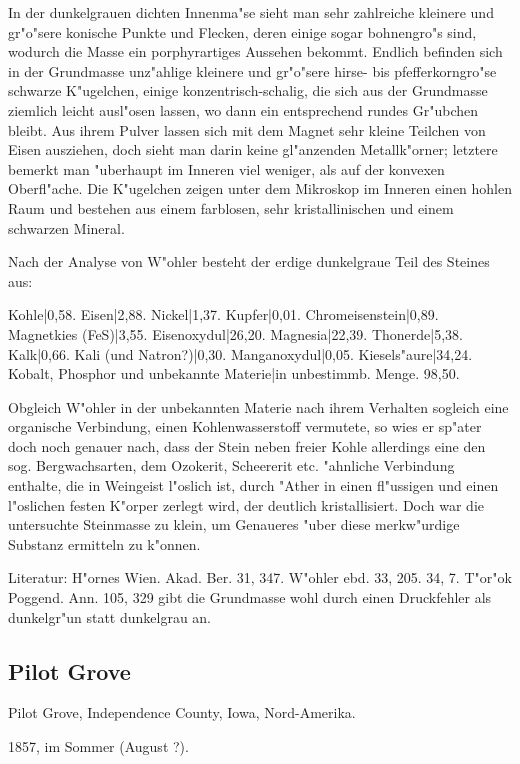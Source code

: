 \documentclass[a4paper, 11pt, oneside]{article}
\begin{document}
In der dunkelgrauen dichten Innenma"se sieht man sehr zahlreiche kleinere und gr"o"sere konische Punkte und Flecken, deren einige sogar bohnengro"s sind, wodurch die Masse ein porphyrartiges Aussehen bekommt. Endlich befinden sich in der Grundmasse unz"ahlige kleinere und gr"o"sere hirse- bis pfefferkorngro"se schwarze K"ugelchen, einige konzentrisch-schalig, die sich aus der Grundmasse ziemlich leicht ausl"osen lassen, wo dann ein entsprechend rundes Gr"ubchen bleibt. Aus ihrem Pulver lassen sich mit dem Magnet sehr kleine Teilchen von Eisen ausziehen, doch sieht man darin keine gl"anzenden Metallk"orner; letztere bemerkt man "uberhaupt im Inneren viel weniger, als auf der konvexen Oberfl"ache. Die K"ugelchen zeigen unter dem Mikroskop im Inneren einen hohlen Raum und bestehen aus einem farblosen, sehr kristallinischen und einem schwarzen Mineral.

Nach der Analyse von W"ohler besteht der erdige dunkelgraue Teil des Steines aus:

Kohle|0,58.  
Eisen|2,88.  
Nickel|1,37.  
Kupfer|0,01.  
Chromeisenstein|0,89.  
Magnetkies (FeS)|3,55.  
Eisenoxydul|26,20.  
Magnesia|22,39.  
Thonerde|5,38.  
Kalk|0,66.  
Kali (und Natron?)|0,30.  
Manganoxydul|0,05.  
Kiesels"aure|34,24.  
Kobalt, Phosphor und unbekannte Materie|in unbestimmb. Menge.  
98,50.

Obgleich W"ohler in der unbekannten Materie nach ihrem Verhalten sogleich eine organische Verbindung, einen Kohlenwasserstoff vermutete, so wies er sp"ater doch noch genauer nach, dass der Stein neben freier Kohle allerdings eine den sog. Bergwachsarten, dem Ozokerit, Scheererit etc. "ahnliche Verbindung enthalte, die in Weingeist l"oslich ist, durch "Ather in einen fl"ussigen und einen l"oslichen festen K"orper zerlegt wird, der deutlich kristallisiert. Doch war die untersuchte Steinmasse zu klein, um Genaueres "uber diese merkw"urdige Substanz ermitteln zu k"onnen.

Literatur: H"ornes Wien. Akad. Ber. 31, 347. W"ohler ebd. 33, 205. 34, 7. T"or"ok Poggend. Ann. 105, 329 gibt die Grundmasse wohl durch einen Druckfehler als dunkelgr"un statt dunkelgrau an.

\subsection{Pilot Grove}

Pilot Grove, Independence County, Iowa, Nord-Amerika.

1857, im Sommer (August ?).
\end{document}
